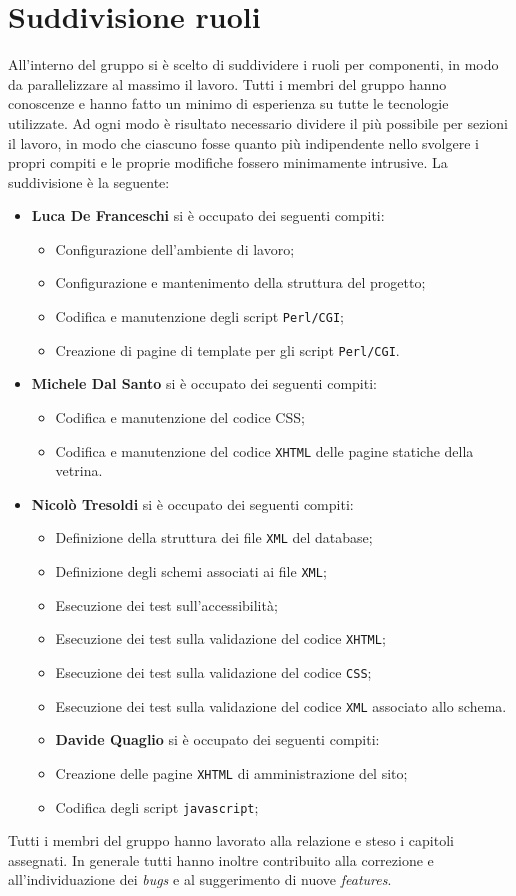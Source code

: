 \section{Suddivisione ruoli}

All'interno del gruppo si è scelto di suddividere i ruoli per componenti, in modo da parallelizzare al massimo il lavoro. Tutti i membri del gruppo hanno conoscenze e hanno fatto un minimo di esperienza su tutte le tecnologie utilizzate. Ad ogni modo è risultato necessario dividere il più possibile per sezioni il lavoro, in modo che ciascuno fosse quanto più indipendente nello svolgere i propri compiti e le proprie modifiche fossero minimamente intrusive. La suddivisione è la seguente:

\begin{itemize}
	\item \textbf{Luca De Franceschi} si è occupato dei seguenti compiti:
	\begin{itemize}
		\item Configurazione dell'ambiente di lavoro;
		\item Configurazione e mantenimento della struttura del progetto;
		\item Codifica e manutenzione degli script \texttt{Perl/CGI};
		\item Creazione di pagine di template per gli script \texttt{Perl/CGI}.
	\end{itemize}
	\item \textbf{Michele Dal Santo} si è occupato dei seguenti compiti:
	\begin{itemize}
		\item Codifica e manutenzione del codice CSS;
		\item Codifica e manutenzione del codice \texttt{XHTML} delle pagine statiche della vetrina.
	\end{itemize}
	\item \textbf{Nicolò Tresoldi} si è occupato dei seguenti compiti:
	\begin{itemize}
		\item Definizione della struttura dei file \texttt{XML} del database;
		\item Definizione degli schemi associati ai file \texttt{XML};
		\item Esecuzione dei test sull'accessibilità;
		\item Esecuzione dei test sulla validazione del codice \texttt{XHTML};
		\item Esecuzione dei test sulla validazione del codice \texttt{CSS};
		\item Esecuzione dei test sulla validazione del codice \texttt{XML} associato allo schema.
	\end{itemize}
	\begin{itemize}
	\item \textbf{Davide Quaglio} si è occupato dei seguenti compiti:
		\item Creazione delle pagine \texttt{XHTML} di amministrazione del sito;
		\item Codifica degli script \texttt{javascript};
	\end{itemize}
\end{itemize}
Tutti i membri del gruppo hanno lavorato alla relazione e steso i capitoli assegnati. In generale tutti hanno inoltre contribuito alla correzione e all'individuazione dei \textit{bugs} e al suggerimento di nuove \textit{features}.